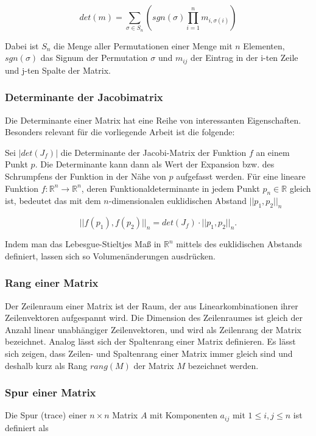 \documentclass[a4paper,fontsize=12pt,toc=bib,parskip=half,ngerman]{scrartcl}
\begin{document}
\begin{equation}
	det(m) = \sum_{\sigma \in S_n} \left( sgn(\sigma) \prod_{i=1}^{n} m_{i,\sigma(i)}\right)
\end{equation}

Dabei ist $S_n$ die Menge aller Permutationen einer Menge mit $n$ Elementen, $sgn(\sigma)$ das Signum der Permutation $\sigma$ und $m_{ij}$ der Eintrag in der i-ten Zeile und j-ten Spalte der Matrix.

\subsubsection{Determinante der Jacobimatrix}
Die Determinante einer Matrix hat eine Reihe von interessanten Eigenschaften. Besonders relevant f\"ur die vorliegende Arbeit ist die folgende:

Sei $|det(J_f)|$ die Determinante der Jacobi-Matrix der Funktion $f$ an einem Punkt $p$. Die Determinante kann dann als Wert der Expansion bzw. des Schrumpfens der Funktion in der N\"ahe von $p$ aufgefasst werden. F\"ur eine lineare Funktion $f: \mathbb{R}^n\rightarrow \mathbb{R}^n$, deren Funktionaldeterminante in jedem Punkt $p_n \in \mathbb{R}$ gleich ist, bedeutet das mit dem $n$-dimensionalen euklidischen Abstand $||p_1, p_2||_n$

\begin{equation}
||f(p_1), f(p_2)||_n = det(J_f)\cdot||p_1, p_2||_n.
\end{equation}

Indem man das Lebesgue-Stieltjes Ma{\ss} in $\mathbb{R}^n$ mittels des euklidischen Abstands definiert, lassen sich so Volumen\"anderungen ausdr\"ucken.

\subsubsection{Rang einer Matrix}
Der Zeilenraum einer Matrix ist der Raum, der aus Linearkombinationen ihrer Zeilenvektoren aufgespannt wird. Die Dimension des Zeilenraumes ist gleich der Anzahl linear unabh\"angiger Zeilenvektoren, und wird als Zeilenrang der Matrix bezeichnet. Analog l\"asst sich der Spaltenrang einer Matrix definieren. Es l\"asst sich zeigen, dass Zeilen- und Spaltenrang einer Matrix immer gleich sind und deshalb kurz als Rang $rang(M)$ der Matrix $M$ bezeichnet werden.

\subsubsection{Spur einer Matrix}
Die Spur (trace) einer $n\times n$ Matrix $A$ mit Komponenten $a_{ij}$ mit $1 \leq i,j \leq n$ ist definiert als
\end{document}
